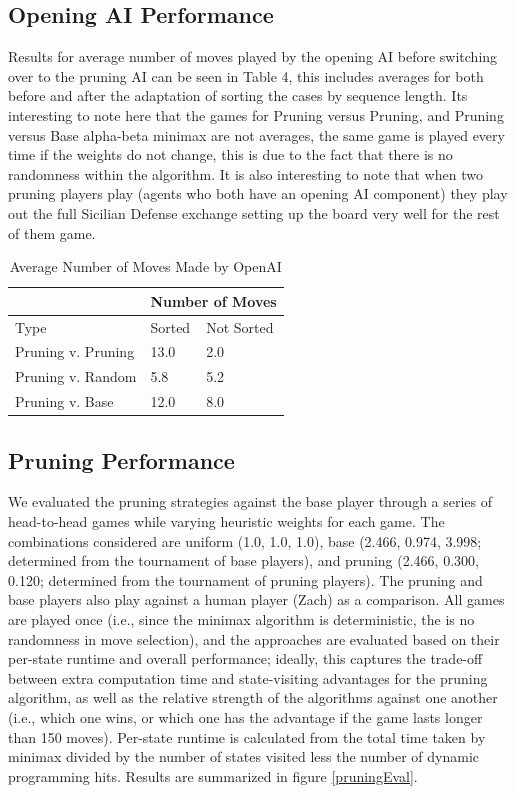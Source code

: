 \documentclass[letterpaper]{article}
\begin{document}
\subsection{Opening AI Performance}
Results for average number of moves played by the opening AI before switching over to the pruning AI can be seen in Table 4, this includes averages for both before and after the adaptation of sorting the cases by sequence length. Its interesting to note here that the games for Pruning versus Pruning, and Pruning versus Base alpha-beta minimax are not averages, the same game is played every time if the weights do not change, this is due to the fact that there is no randomness within the algorithm. It is also interesting to note that when two pruning players play (agents who both have an opening AI component) they play out the full Sicilian Defense exchange setting up the board very well for the rest of them game. 
\begin{table}[]
\centering
\begin{tabular}{|l|l|l|}
\hline
 & \multicolumn{2}{l|}{Number of Moves} \\ \hline
Type & Sorted & Not Sorted \\ \hline
Pruning v. Pruning & 13.0 & 2.0 \\ \hline
Pruning v. Random & 5.8 & 5.2 \\ \hline
Pruning v. Base & 12.0 & 8.0 \\ \hline
\end{tabular}
\caption{Average Number of Moves Made by OpenAI}
\label{tab:my-table}
\end{table}

\subsection{Pruning Performance}
We evaluated the pruning strategies against the base player through a series of head-to-head games while varying heuristic weights for each game.  The combinations considered are uniform (1.0, 1.0, 1.0), base (2.466, 0.974, 3.998; determined from the tournament of base players), and pruning (2.466, 0.300, 0.120; determined from the tournament of pruning players).  The pruning and base players also play against a human player (Zach) as a comparison.  All games are played once (i.e., since the minimax algorithm is deterministic, the is no randomness in move selection), and the approaches are evaluated based on their per-state runtime and overall performance; ideally, this captures the trade-off between extra computation time and state-visiting advantages for the pruning algorithm, as well as the relative strength of the algorithms against one another (i.e., which one wins, or which one has the advantage if the game lasts longer than 150 moves).  Per-state runtime is calculated from the total time taken by minimax divided by the number of states visited less the number of dynamic programming hits.  Results are summarized in figure \ref{pruningEval}.
\end{document}
